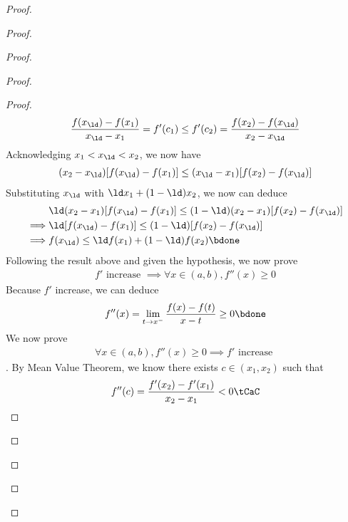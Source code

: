 \documentclass{report}
\begin{document}
\begin{proof}
\begin{proof}
\begin{proof}
\begin{proof}
\begin{proof}
\begin{align*}
\frac{f(x_\ld )-f(x_1)}{x_\ld -x_1}=f'(c_1)\leq f'(c_2)=\frac{f(x_2)-f(x_\ld )}{x_2 -x_\ld }
\end{align*}
Acknowledging $x_1<x_\ld <x_2$, we now have 
\begin{align*}
  (x_2-x_\ld )[f(x_\ld )-f(x_1)]\leq (x_\ld -x_1)[f(x_2)-f(x_\ld )]
\end{align*}
Substituting $x_\ld $ with $\ld x_1+(1-\ld )x_2$, we now can deduce
\begin{align*}
  &\ld  (x_2-x_1)[f(x_\ld )-f(x_1)]\leq (1-\ld )(x_2-x_1)[f(x_2)-f(x_\ld )]\\
  \implies & \ld [f(x_\ld )-f(x_1)]\leq (1-\ld )[f(x_2)-f(x_\ld )]\\
  \implies & f(x_\ld )\leq \ld f(x_1)+(1-\ld )f(x_2)\bdone
\end{align*}
Following the result above and given the hypothesis, we now prove 
\begin{align*}
f'\text{ increase }\implies \forall x\in (a,b),f''(x)\geq 0
\end{align*}
Because $f'$ increase, we can deduce
\begin{align*}
f''(x)=\lim_{t \to x^{-}}\frac{f(x)-f(t)}{x-t}\geq 0\bdone
\end{align*}
We now prove 
\begin{align*}
\forall x\in (a,b),f''(x)\geq 0\implies f'\text{ increase }
\end{align*}
. By Mean Value Theorem, we know there exists $c\in (x_1,x_2)$ such that 
\begin{align*}
f''(c)=\frac{f'(x_2)-f'(x_1)}{x_2-x_1}<0\tCaC
\end{align*}



\end{proof}
\begin{question}{}{}


\end{question}
\end{proof}
\end{proof}
\end{proof}
\end{proof}
\end{document}
